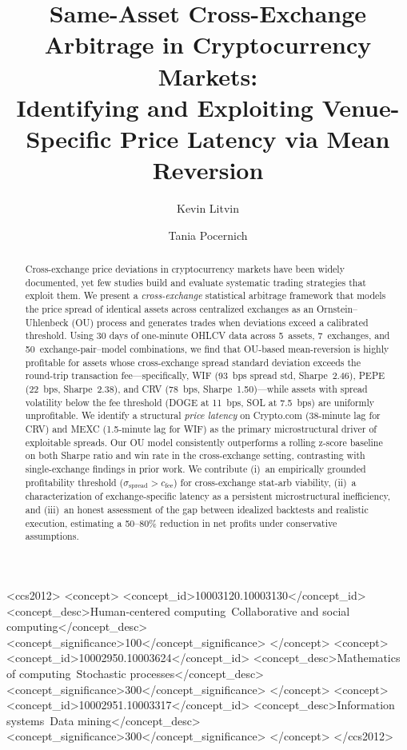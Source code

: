 \documentclass[sigconf,nonacm=false]{acmart}
\begin{document}
\title{Same-Asset Cross-Exchange Arbitrage in Cryptocurrency Markets:\\Identifying and Exploiting Venue-Specific Price Latency via Mean Reversion}

\author{Kevin Litvin}

\author{Tania Pocernich}

\begin{abstract}
Cross-exchange price deviations in cryptocurrency markets have been widely documented, yet few studies build and evaluate systematic trading strategies that exploit them. We present a \emph{cross-exchange} statistical arbitrage framework that models the price spread of identical assets across centralized exchanges as an Ornstein--Uhlenbeck (OU) process and generates trades when deviations exceed a calibrated threshold. Using 30 days of one-minute OHLCV data across 5~assets, 7~exchanges, and 50~exchange-pair--model combinations, we find that OU-based mean-reversion is highly profitable for assets whose cross-exchange spread standard deviation exceeds the round-trip transaction fee---specifically, WIF (93~bps spread std, Sharpe~2.46), PEPE (22~bps, Sharpe~2.38), and CRV (78~bps, Sharpe~1.50)---while assets with spread volatility below the fee threshold (DOGE at 11~bps, SOL at 7.5~bps) are uniformly unprofitable. We identify a structural \emph{price latency} on Crypto.com (38-minute lag for CRV) and MEXC (1.5-minute lag for WIF) as the primary microstructural driver of exploitable spreads. Our OU model consistently outperforms a rolling z-score baseline on both Sharpe ratio and win rate in the cross-exchange setting, contrasting with single-exchange findings in prior work. We contribute (i)~an empirically grounded profitability threshold ($\sigma_{\text{spread}} > c_{\text{fee}}$) for cross-exchange stat-arb viability, (ii)~a characterization of exchange-specific latency as a persistent microstructural inefficiency, and (iii)~an honest assessment of the gap between idealized backtests and realistic execution, estimating a 50--80\% reduction in net profits under conservative assumptions.
\end{abstract}

\begin{CCSXML}
<ccs2012>
  <concept>
    <concept_id>10003120.10003130</concept_id>
    <concept_desc>Human-centered computing~Collaborative and social computing</concept_desc>
    <concept_significance>100</concept_significance>
  </concept>
  <concept>
    <concept_id>10002950.10003624</concept_id>
    <concept_desc>Mathematics of computing~Stochastic processes</concept_desc>
    <concept_significance>300</concept_significance>
  </concept>
  <concept>
    <concept_id>10002951.10003317</concept_id>
    <concept_desc>Information systems~Data mining</concept_desc>
    <concept_significance>300</concept_significance>
  </concept>
</ccs2012>
\end{CCSXML}
\end{document}
